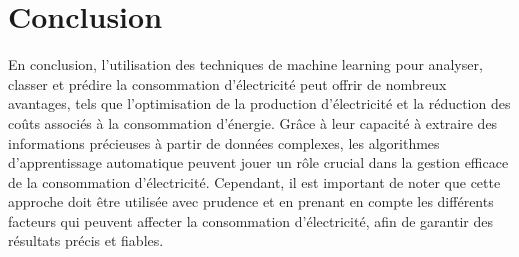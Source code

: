 \documentclass[11pt]{article}
\begin{document}
    \hypertarget{conclusion}{%
\section{Conclusion}\label{conclusion}}

En conclusion, l'utilisation des techniques de machine learning pour
analyser, classer et prédire la consommation d'électricité peut offrir
de nombreux avantages, tels que l'optimisation de la production
d'électricité et la réduction des coûts associés à la consommation
d'énergie. Grâce à leur capacité à extraire des informations précieuses
à partir de données complexes, les algorithmes d'apprentissage
automatique peuvent jouer un rôle crucial dans la gestion efficace de la
consommation d'électricité. Cependant, il est important de noter que
cette approche doit être utilisée avec prudence et en prenant en compte
les différents facteurs qui peuvent affecter la consommation
d'électricité, afin de garantir des résultats précis et fiables.


    
    
    
\end{document}
